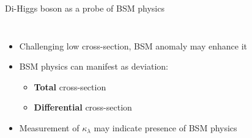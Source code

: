 \begin{frame}{Di-Higgs boson as a probe of BSM physics}

\begin{columns}
\begin{itemize}
    \item Challenging low cross-section, BSM anomaly may enhance it
    \item BSM physics can manifest as deviation:
    \begin{itemize}
        \item \textbf{\textcolor{HHred}{Total}} cross-section
        \item \textbf{\textcolor{HHturquoise_m}{Differential}} cross-section
    \end{itemize}
    \item Measurement of $\kappa_{\lambda}$ may indicate presence of BSM physics 
\end{itemize}


\begin{figure}
    \centering
\end{figure}


\end{columns}
\end{frame}
